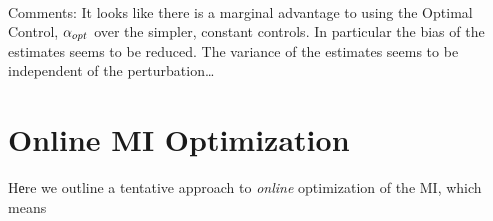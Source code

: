 \begin{table}
\\
\caption{Results for the estimates arising from simulations using various values
of $\a$ (opt, crit, max). In each sub-table there are $N_b$
parameter estimates for each distinct $\a$, with $N_s$ hitting times used to form an $\b-$estimate.
The 'true' value of $\b$ is $\b=1$. }
\label{tab:beta_estimates_from_hitting_times_different_alphas}
\end{table}     
% 

Comments: It looks like there is a marginal advantage to using the 
Optimal Control, $\alpha_{opt}$ over the simpler, constant controls. In particular
the bias of the estimates seems to be reduced. The variance of the estimates
seems to be independent of the perturbation\ldots 
 
\clearpage


\section{Online MI Optimization}
Hеre we outline a tentative approach to {\sl online} optimization of the MI,
which means


